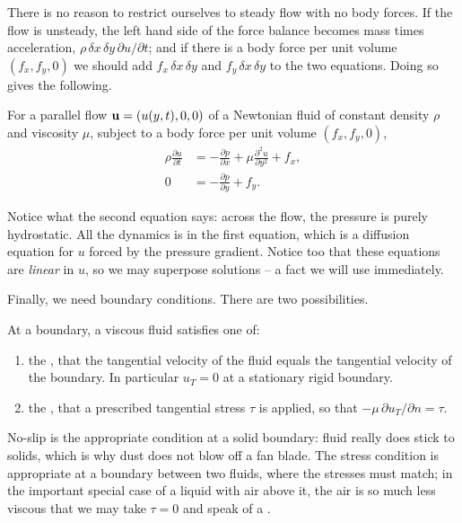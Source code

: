 \documentclass[a4paper]{scrartcl}
\newcommand{\pd}[2]{\frac{\partial #1}{\partial #2}}
\newcommand{\pdd}[2]{\frac{\partial^2 #1}{\partial #2^2}}
\begin{document}
There is no reason to restrict ourselves to steady flow with no body forces. If the flow is unsteady, the left hand side of the force balance becomes mass times acceleration, $\rho \, \delta x \, \delta y \, \partial u / \partial t$; and if there is a body force per unit volume $(f_x, f_y, 0)$ we should add $f_x \, \delta x \, \delta y$ and $f_y \, \delta x \, \delta y$ to the two equations. Doing so gives the following.

\begin{proposition}
	For a parallel flow $\mathbf{u} = (u(y, t), 0, 0)$ of a Newtonian fluid of constant density $\rho$ and viscosity $\mu$, subject to a body force per unit volume $(f_x, f_y, 0)$,
	\begin{align*}
		\rho \pd{u}{t} &= -\pd{p}{x} + \mu \pdd{u}{y} + f_x, \\
		0 &= - \pd{p}{y} + f_y.
	\end{align*}
\end{proposition}

Notice what the second equation says: across the flow, the pressure is purely hydrostatic. All the dynamics is in the first equation, which is a diffusion equation for $u$ forced by the pressure gradient. Notice too that these equations are \emph{linear} in $u$, so we may superpose solutions -- a fact we will use immediately.

Finally, we need boundary conditions. There are two possibilities.

\begin{definition}
	At a boundary, a viscous fluid satisfies one of:
	\begin{enumerate}[label=(\roman*)]
		\item the , that the tangential velocity of the fluid equals the tangential velocity of the boundary. In particular $u_T = 0$ at a stationary rigid boundary.
		\item the , that a prescribed tangential stress $\tau$ is applied, so that $-\mu \, \partial u_T/\partial n = \tau$.
	\end{enumerate}
\end{definition}

No-slip is the appropriate condition at a solid boundary: fluid really does stick to solids, which is why dust does not blow off a fan blade. The stress condition is appropriate at a boundary between two fluids, where the stresses must match; in the important special case of a liquid with air above it, the air is so much less viscous that we may take $\tau = 0$ and speak of a .
\end{document}
